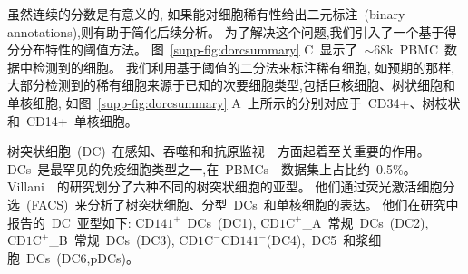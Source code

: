 虽然连续的分数是有意义的,
如果能对细胞稀有性给出二元标注~(binary annotations),则有助于简化后续分析。
为了解决这个问题,我们引入了一个基于得分分布特性的阈值方法。
图~\ref{supp-fig:dorcsummary} C~显示了~${\sim}68$k~PBMC~数据中检测到的细胞。
我们利用基于阈值的二分法来标注稀有细胞,
如预期的那样,
大部分检测到的稀有细胞来源于已知的次要细胞类型,包括巨核细胞、树状细胞和单核细胞,
如图~\ref{supp-fig:dorcsummary} A~上所示的分别对应于~CD34+、树枝状和~CD14+~单核细胞。



树突状细胞~(DC)~在感知、吞噬和和抗原监视~\cite{villani2017single}~方面起着至关重要的作用。
DCs~是最罕见的免疫细胞类型之一,在~PBMCs~\cite{zheng2017massively}~数据集上占比约~0.5\%。
Villani~\cite{villani2017single}~的研究划分了六种不同的树突状细胞的亚型。
他们通过荧光激活细胞分选~(FACS)~来分析了树突状细胞、分型~DCs~和单核细胞的表达。
他们在研究中报告的~DC~亚型如下:
$\text{CD141}^+$~DCs~(DC1), 
$\text{CD1C}^+${\_}A~常规~DCs~(DC2),
$\text{CD1C}^+${\_}B~常规~DCs~(DC3),
$\text{CD1C}^-\text{CD141}^-$(DC4),~DC5~和浆细胞~DCs~(DC6,pDCs)。

